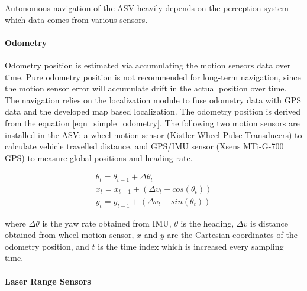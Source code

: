 \documentclass[10 pt,a4paper,conference]{IEEEtran}
\begin{document}
Autonomous navigation of the ASV heavily depends on the perception
system which data comes from various sensors.

\paragraph{Odometry}\label{odometry}

Odometry position is estimated via accumulating the motion sensors data
over time. Pure odometry position is not recommended for long-term
navigation, since the motion sensor error will accumulate drift in the
actual position over time. The navigation relies on the localization
module to fuse odometry data with GPS data and the developed map based
localization. The odometry position is derived from the equation
\ref{eqn_simple_odometry}. The following two motion sensors are
installed in the ASV: a wheel motion sensor (Kistler Wheel Pulse
Transducers) to calculate vehicle travelled distance, and GPS/IMU sensor
(Xsens MTi-G-700 GPS) to measure global positions and heading rate.

\begin{equation}
\begin{split}
\label{eqn_simple_odometry}
\theta_t = \theta_{t-1} + \Delta\theta_{t} \\
x_t = x_{t-1} + (\Delta v_t + cos(\theta_t)) \\
y_t = y_{t-1} + (\Delta v_t + sin(\theta_t))
\end{split}
\end{equation}

where \(\Delta\theta\) is the yaw rate obtained from IMU, \(\theta\) is
the heading, \(\Delta v\) is distance obtained from wheel motion sensor,
\(x\) and \(y\) are the Cartesian coordinates of the odometry position,
and \(t\) is the time index which is increased every sampling time.

\paragraph{Laser Range Sensors}\label{laser-range-sensors}
\end{document}
